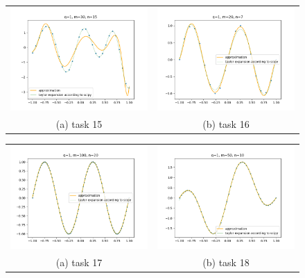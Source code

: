 \documentclass[12pt, a4paper, parskip=half]{scrartcl}
\begin{document}
\begin{enumerate}[leftmargin=0.5cm, label=(\roman*)]
        \begin{figure}
            \begin{tabular}{cc}
                \includegraphics[width=72mm]{task_15} &   \includegraphics[width=72mm]{task_16} \\
                (a) task 15 & (b) task 16 \\[6pt]
            \end{tabular}
        \end{figure}

        \begin{figure}
            \begin{tabular}{cc}
                \includegraphics[width=72mm]{task_17} &   \includegraphics[width=72mm]{task_18} \\
                (a) task 17 & (b) task 18 \\[6pt]
            \end{tabular}
        \end{figure}
            

\end{enumerate}
\end{document}
